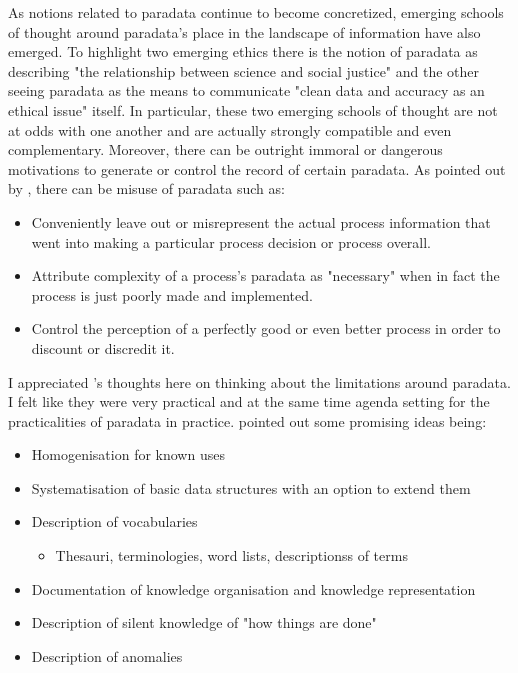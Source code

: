 \documentclass[class=article, crop=false]{standalone}
\begin{document}
As notions related to paradata continue to become concretized, emerging schools of thought around paradata's place in the landscape of information have also emerged.
To highlight two emerging ethics there is the notion of paradata as describing "the relationship between science and social justice" and the other seeing paradata as the means to communicate "clean data and accuracy as an ethical issue" itself. \cite{mickel2023cultural}
In particular, these two emerging schools of thought are not at odds with one another and are actually strongly compatible and even complementary.
Moreover, there can be outright immoral or dangerous motivations to generate or control the record of certain paradata.
As pointed out by \cite{huvilaPerspectivesParadataResearch2024}, there can be misuse of paradata such as:

\begin{itemize}

  \item Conveniently leave out or misrepresent the actual process information that went into making a particular process decision or process overall.

  \item Attribute complexity of a process's paradata as "necessary" when in fact the process is just poorly made and implemented.

  \item Control the perception of a perfectly good or even better process in order to discount or discredit it.

\end{itemize}


I appreciated 's thoughts here on thinking about the limitations around paradata.
I felt like they were very practical and at the same time agenda setting for the practicalities of paradata in practice.
 pointed out some promising ideas being:

\begin{itemize}
  \item Homogenisation for known uses 
  \item Systematisation of basic data structures with an option to extend them
  \item Description of vocabularies
  \begin{itemize}
    \item Thesauri, terminologies, word lists, descriptionss of terms
  \end{itemize}
  \item Documentation of knowledge organisation and knowledge representation
  \item Description of silent knowledge of "how things are done"
  \item Description of anomalies
\end{itemize}
\end{document}
